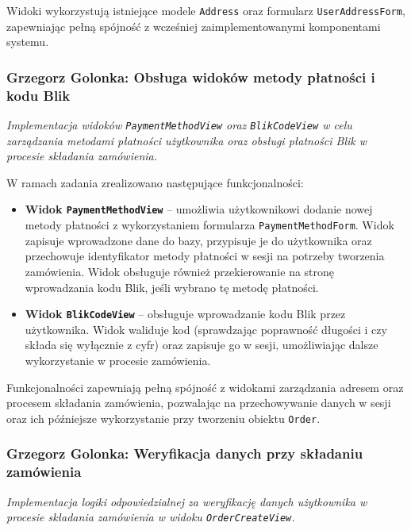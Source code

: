\documentclass[12pt,a4paper,oneside]{article}
\theoremstyle{definition}
\numberwithin{equation}{section}
\begin{document}
Widoki wykorzystują istniejące modele \texttt{Address} oraz formularz \texttt{UserAddressForm}, zapewniając pełną spójność z wcześniej zaimplementowanymi komponentami systemu.

%
%
\subsubsection{Grzegorz Golonka: Obsługa widoków metody płatności i kodu Blik}
\label{section:1.3.25}
\textit{
Implementacja widoków \texttt{PaymentMethodView} oraz \texttt{BlikCodeView} w celu zarządzania metodami płatności użytkownika oraz obsługi płatności Blik w procesie składania zamówienia.
}

W ramach zadania zrealizowano następujące funkcjonalności:
\begin{itemize}
    \item \textbf{Widok \texttt{PaymentMethodView}} – umożliwia użytkownikowi dodanie nowej metody płatności z wykorzystaniem formularza \texttt{PaymentMethodForm}. Widok zapisuje wprowadzone dane do bazy, przypisuje je do użytkownika oraz przechowuje identyfikator metody płatności w sesji na potrzeby tworzenia zamówienia. Widok obsługuje również przekierowanie na stronę wprowadzania kodu Blik, jeśli wybrano tę metodę płatności.
    \item \textbf{Widok \texttt{BlikCodeView}} – obsługuje wprowadzanie kodu Blik przez użytkownika. Widok waliduje kod (sprawdzając poprawność długości i czy składa się wyłącznie z cyfr) oraz zapisuje go w sesji, umożliwiając dalsze wykorzystanie w procesie zamówienia.
\end{itemize}

Funkcjonalności zapewniają pełną spójność z widokami zarządzania adresem oraz procesem składania zamówienia, pozwalając na przechowywanie danych w sesji oraz ich późniejsze wykorzystanie przy tworzeniu obiektu \texttt{Order}.

%
%
\subsubsection{Grzegorz Golonka: Weryfikacja danych przy składaniu zamówienia}
\label{section:1.3.26}
\textit{
Implementacja logiki odpowiedzialnej za weryfikację danych użytkownika w procesie składania zamówienia w widoku \texttt{OrderCreateView}.
}
\end{document}
